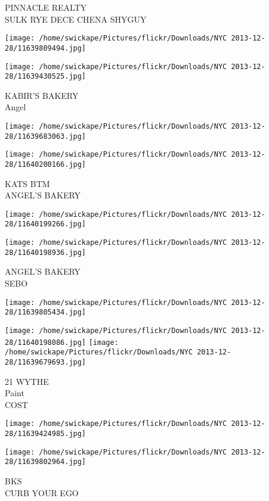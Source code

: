 \documentclass[10pt,letterpaper]{article}
\begin{document}
PINNACLE REALTY\\
SULK RYE DECE CHENA SHYGUY
\pagebreak

\texttt{[image: /home/swickape/Pictures/flickr/Downloads/NYC 2013-12-28/11639809494.jpg]}

\vspace{0.25in}
\texttt{[image: /home/swickape/Pictures/flickr/Downloads/NYC 2013-12-28/11639430525.jpg]}

KABIR'S BAKERY\\
Angel
\pagebreak

\texttt{[image: /home/swickape/Pictures/flickr/Downloads/NYC 2013-12-28/11639683063.jpg]}

\vspace{0.25in}
\texttt{[image: /home/swickape/Pictures/flickr/Downloads/NYC 2013-12-28/11640200166.jpg]}

KATS BTM\\
ANGEL'S BAKERY
\pagebreak

\texttt{[image: /home/swickape/Pictures/flickr/Downloads/NYC 2013-12-28/11640199266.jpg]}

\vspace{0.25in}
\texttt{[image: /home/swickape/Pictures/flickr/Downloads/NYC 2013-12-28/11640198936.jpg]}

ANGEL'S BAKERY\\
SEBO
\pagebreak

\texttt{[image: /home/swickape/Pictures/flickr/Downloads/NYC 2013-12-28/11639805434.jpg]}

\vspace{0.25in}
\texttt{[image: /home/swickape/Pictures/flickr/Downloads/NYC 2013-12-28/11640198086.jpg]}
\texttt{[image: /home/swickape/Pictures/flickr/Downloads/NYC 2013-12-28/11639679693.jpg]}

21 WYTHE\\
Paint\\
COST
\pagebreak

\texttt{[image: /home/swickape/Pictures/flickr/Downloads/NYC 2013-12-28/11639424985.jpg]}

\vspace{0.25in}
\texttt{[image: /home/swickape/Pictures/flickr/Downloads/NYC 2013-12-28/11639802964.jpg]}

BKS\\
CURB YOUR EGO
\pagebreak
\end{document}
